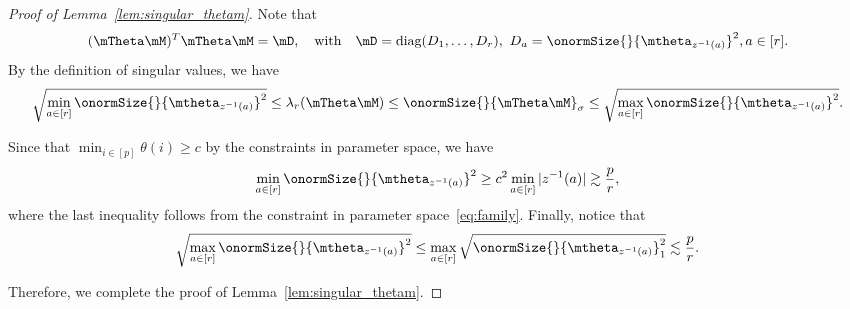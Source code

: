 \documentclass[lettersize,onecolumn,journal]{IEEEtran}
\theoremstyle{definition}
\theoremstyle{definition}
\begin{document}
\begin{proof}[Proof of Lemma~\ref{lem:singular_thetam}] Note that 
\begin{equation}
    (\mTheta\mM)^T \mTheta \mM = \mD, \quad \text{with} \quad \mD = \text{diag}(D_1,\ldots, D_r), \ D_a = \onormSize{}{\mtheta_{z^{-1}(a)}}^2, a \in [r].
\end{equation}
By the definition of singular values, we have 
\begin{equation}
     \sqrt{\min_{a \in [r]}\onormSize{}{ \mtheta_{ z^{-1}(a)} }^2 } \leq \lambda_r(\mTheta \mM) \leq \onormSize{}{\mTheta\mM}_{\sigma} \leq \sqrt{ \max_{a \in [r]}\onormSize{}{ \mtheta_{ z^{-1}(a)} }^2}.
\end{equation}

Since that $\min_{i \in [p]}\theta(i) \geq c$ by the constraints in parameter space, we have  
\begin{equation}
   \min_{a \in [r]} \onormSize{}{ \mtheta_{ z^{-1}(a)} }^2 \geq c^2 \min_{a \in [r]} |z^{-1}(a)| \gtrsim \frac{p}{r},
\end{equation}
where the last inequality follows from the constraint in parameter space~\eqref{eq:family}. Finally, notice that 
\begin{equation}
    \sqrt{\max_{a \in [r]}\onormSize{}{ \mtheta_{ z^{-1}(a)} }^2 } \leq \max_{a \in [r]} \sqrt{ \onormSize{}{ \mtheta_{ z^{-1}(a)} }^2_1} \lesssim \frac{p}{r}.
\end{equation}

 Therefore, we complete the proof of Lemma~\ref{lem:singular_thetam}.
\end{proof}
\end{document}

